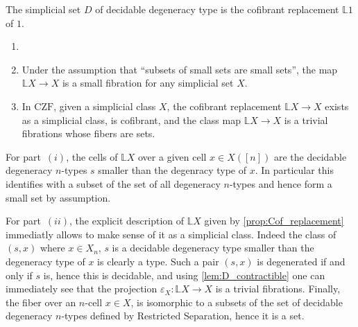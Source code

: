 \documentclass[reqno,10pt,a4paper,oneside,draft]{amsart}
\makeatletter
\renewenvironment{proof}[1][\proofname] {\par\pushQED{\qed}\normalfont\topsep6\p@\@plus6\p@\relax\trivlist\item[\hskip\labelsep\bf#1\@addpunct{.}]\ignorespaces}{\popQED\endtrivlist\@endpefalse}
\numberwithin{equation}{section}
\theoremstyle{mythm}
\theoremstyle{mydef}
\theoremstyle{myrmk}
\newcommand{\co}{\colon}
\makeatother
\begin{document}
\begin{corollary}
The simplicial set $D$ of decidable degeneracy type is the cofibrant replacement $\mathbb{L} 1$ of $1$.
\end{corollary}

\begin{corollary} \label{cor:cofibrant_smallness}
\begin{enumerate}[$(i)$]

\item[]
 
\item Under the assumption that ``subsets of small sets are small sets'', the map $\mathbb{L} X \rightarrow X$ is a small fibration for any simplicial set $X$.

\item In $\mathrm{CZF}$, given a simplicial class $X$, the cofibrant replacement $\mathbb{L} X \rightarrow X$ exists as a simplicial class, is cofibrant, and the class map $\mathbb{L} X \rightarrow X$ is a trivial fibrations whose fibers are sets.

\end{enumerate}
\end{corollary}

\begin{proof}

For part~$(i)$, the cells of $\mathbb{L} X$ over a given cell $x \in X([n])$ are the decidable degeneracy $n$-types $s$ smaller than the degenracy type of $x$. In particular this identifies with a subset of the set of all degeneracy $n$-types and hence form a small set by assumption.

For part~$(ii)$, the explicit description of $\mathbb{L} X$ given by \cref{prop:Cof_replacement} immediatly allows to make sense of it as a simplicial class. Indeed the class of $(s,x)$ where $x\in X_n$, $s$ is a decidable degeneracy type smaller than the degeneracy type of $x$ is clearly a type. Such a pair $(s,x)$ is degenerated if and only if $s$ is, hence this is decidable, and using \cref{lem:D_contractible} one can immediately see that the projection $\varepsilon_X \co \mathbb{L} X \rightarrow X$ is a trivial fibrations. Finally, the fiber over an $n$-cell $x \in X$, is isomorphic to a subsets of the set of decidable degeneracy $n$-types defined by Restricted Separation, hence it is a set.
\end{proof}
\end{document}
